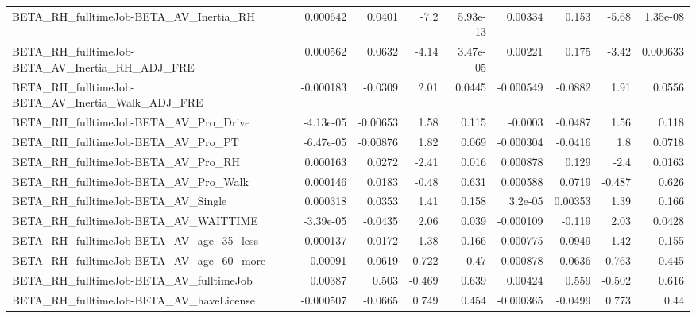 \begin{tabular}{lrrrrrrrr}
BETA\_RH\_fulltimeJob-BETA\_AV\_Inertia\_RH             &    0.000642 &       0.0401 &     -7.2 & 5.93e-13 &    0.00334 &       0.153 &        -5.68 &      1.35e-08 \\
BETA\_RH\_fulltimeJob-BETA\_AV\_Inertia\_RH\_ADJ\_FRE     &    0.000562 &       0.0632 &    -4.14 & 3.47e-05 &    0.00221 &       0.175 &        -3.42 &      0.000633 \\
BETA\_RH\_fulltimeJob-BETA\_AV\_Inertia\_Walk\_ADJ\_FRE   &   -0.000183 &      -0.0309 &     2.01 &   0.0445 &  -0.000549 &     -0.0882 &         1.91 &        0.0556 \\
BETA\_RH\_fulltimeJob-BETA\_AV\_Pro\_Drive              &   -4.13e-05 &     -0.00653 &     1.58 &    0.115 &    -0.0003 &     -0.0487 &         1.56 &         0.118 \\
BETA\_RH\_fulltimeJob-BETA\_AV\_Pro\_PT                 &   -6.47e-05 &     -0.00876 &     1.82 &    0.069 &  -0.000304 &     -0.0416 &          1.8 &        0.0718 \\
BETA\_RH\_fulltimeJob-BETA\_AV\_Pro\_RH                 &    0.000163 &       0.0272 &    -2.41 &    0.016 &   0.000878 &       0.129 &         -2.4 &        0.0163 \\
BETA\_RH\_fulltimeJob-BETA\_AV\_Pro\_Walk               &    0.000146 &       0.0183 &    -0.48 &    0.631 &   0.000588 &      0.0719 &       -0.487 &         0.626 \\
BETA\_RH\_fulltimeJob-BETA\_AV\_Single                 &    0.000318 &       0.0353 &     1.41 &    0.158 &    3.2e-05 &     0.00353 &         1.39 &         0.166 \\
BETA\_RH\_fulltimeJob-BETA\_AV\_WAITTIME               &   -3.39e-05 &      -0.0435 &     2.06 &    0.039 &  -0.000109 &      -0.119 &         2.03 &        0.0428 \\
BETA\_RH\_fulltimeJob-BETA\_AV\_age\_35\_less            &    0.000137 &       0.0172 &    -1.38 &    0.166 &   0.000775 &      0.0949 &        -1.42 &         0.155 \\
BETA\_RH\_fulltimeJob-BETA\_AV\_age\_60\_more            &     0.00091 &       0.0619 &    0.722 &     0.47 &   0.000878 &      0.0636 &        0.763 &         0.445 \\
BETA\_RH\_fulltimeJob-BETA\_AV\_fulltimeJob            &     0.00387 &        0.503 &   -0.469 &    0.639 &    0.00424 &       0.559 &       -0.502 &         0.616 \\
BETA\_RH\_fulltimeJob-BETA\_AV\_haveLicense            &   -0.000507 &      -0.0665 &    0.749 &    0.454 &  -0.000365 &     -0.0499 &        0.773 &          0.44 \\

\end{tabular}
